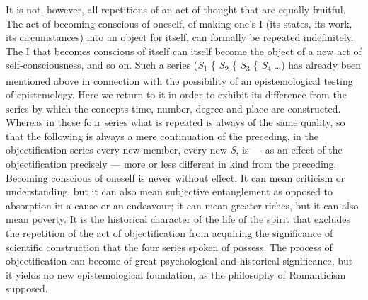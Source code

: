 \documentclass[12pt]{book}
\begin{document}
It is not, however, all repetitions of an act of thought that are equally
fruitful. The act of becoming conscious of oneself, of making one's I (its
states, its work, its circumstances) into an object for itself, can formally be
repeated indefinitely. The I that becomes conscious of itself can itself become
the object of a new act of self-consciousness, and so on. Such a series
(\textit{S}\textsubscript{1} \{ \textit{S}\textsubscript{2} \{
\textit{S}\textsubscript{3} \{ \textit{S}\textsubscript{4} \dots) has already
been mentioned above in connection with the possibility of an epistemological
testing of epistemology. Here we return to it in order to exhibit its difference
from the series by which the concepts time, number, degree and place are
constructed. Whereas in those four series what is repeated is always of the same
quality, so that the following is always a mere continuation of the preceding, in
the objectification-series every new member, every new \textit{S}, is --- as an
effect of the objectification precisely --- more or less different in kind from
the preceding. Becoming conscious of oneself is never without effect. It can mean
criticism or understanding, but it can also mean subjective entanglement as
opposed to absorption in a cause or an endeavour; it can mean greater riches, but
it can also mean poverty. It is the historical character of the life of the
spirit that excludes the repetition of the act of objectification from acquiring
the significance of scientific construction that the four series spoken of
possess. The process of objectification can become of great psychological and
historical significance, but it yields no new epistemological foundation, as the
philosophy of Romanticism supposed.
\end{document}
